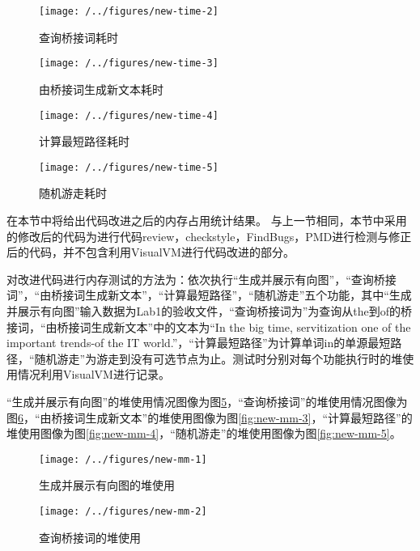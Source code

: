 \begin{figure}
\centering
\texttt{[image: /../figures/new-time-2]}
\caption{查询桥接词耗时}
\label{fig:new-time-2}
\end{figure}

\begin{figure}
\centering
\texttt{[image: /../figures/new-time-3]}
\caption{由桥接词生成新文本耗时}
\label{fig:new-time-3}
\end{figure}

\begin{figure}
\centering
\texttt{[image: /../figures/new-time-4]}
\caption{计算最短路径耗时}
\label{fig:new-time-4}
\end{figure}

\begin{figure}
\centering
\texttt{[image: /../figures/new-time-5]}
\caption{随机游走耗时}
\label{fig:new-time-5}
\end{figure}

在本节中将给出代码改进之后的内存占用统计结果。
与上一节相同，本节中采用的修改后的代码为进行代码review，checkstyle，FindBugs，PMD进行检测与修正后的代码，并不包含利用VisualVM进行代码改进的部分。

对改进代码进行内存测试的方法为：依次执行“生成并展示有向图”，“查询桥接词”，“由桥接词生成新文本”，“计算最短路径”，“随机游走”五个功能，其中“生成并展示有向图”输入数据为Lab1的验收文件，“查询桥接词为”为查询从the到of的桥接词，“由桥接词生成新文本”中的文本为“In the big time, servitization one of the important trends-of the IT world.”，“计算最短路径”为计算单词in的单源最短路径，“随机游走”为游走到没有可选节点为止。测试时分别对每个功能执行时的堆使用情况利用VisualVM进行记录。

“生成并展示有向图”的堆使用情况图像为图\ref{fig:new-mm-1}，“查询桥接词”的堆使用情况图像为图\ref{fig:new-mm-2}，“由桥接词生成新文本”的堆使用图像为图\ref{fig:new-mm-3}，“计算最短路径”的堆使用图像为图\ref{fig:new-mm-4}，“随机游走”的堆使用图像为图\ref{fig:new-mm-5}。

\begin{figure}
\centering
\texttt{[image: /../figures/new-mm-1]}
\caption{生成并展示有向图的堆使用}
\label{fig:new-mm-1}
\end{figure}

\begin{figure}
\centering
\texttt{[image: /../figures/new-mm-2]}
\caption{查询桥接词的堆使用}
\label{fig:new-mm-2}
\end{figure}

